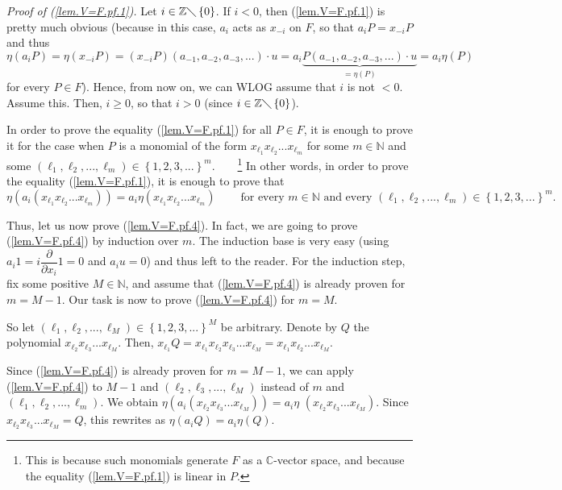 \documentclass
[numbers=enddot,12pt,final,onecolumn,german,notitlepage]{scrartcl}%
\theoremstyle{definition}
\begin{document}
\textit{Proof of (\ref{lem.V=F.pf.1}).} Let $i\in\mathbb{Z}\diagdown\left\{
0\right\}  $. If $i<0$, then (\ref{lem.V=F.pf.1}) is pretty much obvious
(because in this case, $a_{i}$ acts as $x_{-i}$ on $F$, so that $a_{i}%
P=x_{-i}P$ and thus%
\[
\eta\left(  a_{i}P\right)  =\eta\left(  x_{-i}P\right)  =\left(
x_{-i}P\right)  \left(  a_{-1},a_{-2},a_{-3},...\right)  \cdot u=a_{i}%
\underbrace{P\left(  a_{-1},a_{-2},a_{-3},...\right)  \cdot u}_{=\eta\left(
P\right)  }=a_{i}\eta\left(  P\right)
\]
for every $P\in F$). Hence, from now on, we can WLOG assume that $i$ is not
$<0$. Assume this. Then, $i\geq0$, so that $i>0$ (since $i\in\mathbb{Z}%
\diagdown\left\{  0\right\}  $).

In order to prove the equality (\ref{lem.V=F.pf.1}) for all $P\in F$, it is
enough to prove it for the case when $P$ is a monomial of the form
$x_{\ell_{1}}x_{\ell_{2}}...x_{\ell_{m}}$ for some $m\in\mathbb{N}$ and some
$\left(  \ell_{1},\ell_{2},...,\ell_{m}\right)  \in\left\{  1,2,3,...\right\}
^{m}$.\ \ \ \ \footnote{This is because such monomials generate $F$ as a
$\mathbb{C}$-vector space, and because the equality (\ref{lem.V=F.pf.1}) is
linear in $P$.} In other words, in order to prove the equality
(\ref{lem.V=F.pf.1}), it is enough to prove that%
\begin{equation}
\eta\left(  a_{i}\left(  x_{\ell_{1}}x_{\ell_{2}}...x_{\ell_{m}}\right)
\right)  =a_{i}\eta\left(  x_{\ell_{1}}x_{\ell_{2}}...x_{\ell_{m}}\right)
\ \ \ \ \ \ \ \ \ \ \text{for every }m\in\mathbb{N}\text{ and every }\left(
\ell_{1},\ell_{2},...,\ell_{m}\right)  \in\left\{  1,2,3,...\right\}  ^{m}.
\label{lem.V=F.pf.4}%
\end{equation}


Thus, let us now prove (\ref{lem.V=F.pf.4}). In fact, we are going to prove
(\ref{lem.V=F.pf.4}) by induction over $m$. The induction base is very easy
(using $a_{i}1=i\dfrac{\partial}{\partial x_{i}}1=0$ and $a_{i}u=0$) and thus
left to the reader. For the induction step, fix some positive $M\in\mathbb{N}%
$, and assume that (\ref{lem.V=F.pf.4}) is already proven for $m=M-1$. Our
task is now to prove (\ref{lem.V=F.pf.4}) for $m=M$.

So let $\left(  \ell_{1},\ell_{2},...,\ell_{M}\right)  \in\left\{
1,2,3,...\right\}  ^{M}$ be arbitrary. Denote by $Q$ the polynomial
$x_{\ell_{2}}x_{\ell_{3}}...x_{\ell_{M}}$. Then, $x_{\ell_{1}}Q=x_{\ell_{1}%
}x_{\ell_{2}}x_{\ell_{3}}...x_{\ell_{M}}=x_{\ell_{1}}x_{\ell_{2}}%
...x_{\ell_{M}}$.

Since (\ref{lem.V=F.pf.4}) is already proven for $m=M-1$, we can apply
(\ref{lem.V=F.pf.4}) to $M-1$ and $\left(  \ell_{2},\ell_{3},...,\ell
_{M}\right)  $ instead of $m$ and $\left(  \ell_{1},\ell_{2},...,\ell
_{m}\right)  $. We obtain $\eta\left(  a_{i}\left(  x_{\ell_{2}}x_{\ell_{3}%
}...x_{\ell_{M}}\right)  \right)  =a_{i}\eta$ $\left(  x_{\ell_{2}}x_{\ell
_{3}}...x_{\ell_{M}}\right)  $. Since $x_{\ell_{2}}x_{\ell_{3}}...x_{\ell_{M}%
}=Q$, this rewrites as $\eta\left(  a_{i}Q\right)  =a_{i}\eta\left(  Q\right)
$.
\end{document}
